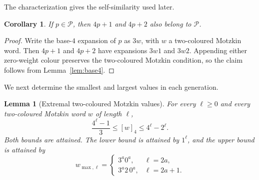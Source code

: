 \documentclass[12pt]{article}
\theoremstyle{plain}
\newtheorem{lemma}[theorem]{Lemma}
\newtheorem{corollary}[theorem]{Corollary}
\theoremstyle{definition}
\theoremstyle{plain}
\newcommand{\Pset}{\mathcal{P}}
\begin{document}
The characterization gives the self-similarity used later.

\begin{corollary}\label{cor:Pclosure}
If $p\in\Pset$, then $4p+1$ and $4p+2$ also belong to $\Pset$.
\end{corollary}

\begin{proof}
Write the base-$4$ expansion of $p$ as $3w$, with $w$ a two-coloured Motzkin
word.  Then $4p+1$ and $4p+2$ have expansions $3w1$ and $3w2$.  Appending either
zero-weight colour preserves the two-coloured Motzkin condition, so the claim
follows from Lemma~\ref{lem:base4}.
\end{proof}

We next determine the smallest and largest values in each generation.

\begin{lemma}[Extremal two-coloured Motzkin values]\label{lem:extremal}
For every $\ell\geq0$ and every two-coloured Motzkin word $w$ of length $\ell$,
\begin{equation}\label{eq:motzkin-extrema}
  \frac{4^{\ell}-1}{3}\leq[w]_4\leq4^{\ell}-2^{\ell}.
\end{equation}
Both bounds are attained.  The lower bound is attained by $1^{\ell}$, and the
upper bound is attained by
\[
  w_{\max,\ell}=
  \begin{cases}
    3^a0^a,&\ell=2a,\\
    3^a2\,0^a,&\ell=2a+1.
  \end{cases}
\]
\end{lemma}
\end{document}
